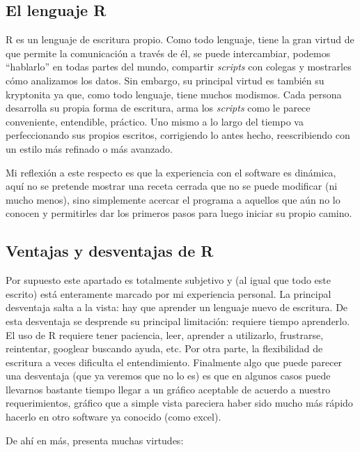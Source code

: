 \documentclass[
]{article}
\begin{document}
\subsection{El lenguaje R}\label{el-lenguaje-r}

R es un lenguaje de escritura propio. Como todo lenguaje, tiene la gran
virtud de que permite la comunicación a través de él, se puede
intercambiar, podemos ``hablarlo'' en todas partes del mundo, compartir
\emph{scripts} con colegas y mostrarles cómo analizamos los datos. Sin
embargo, su principal virtud es también su kryptonita ya que, como todo
lenguaje, tiene muchos modismos. Cada persona desarrolla su propia forma
de escritura, arma los \emph{scripts} como le parece conveniente,
entendible, práctico. Uno mismo a lo largo del tiempo va perfeccionando
sus propios escritos, corrigiendo lo antes hecho, reescribiendo con un
estilo más refinado o más avanzado.

Mi reflexión a este respecto es que la experiencia con el software es
dinámica, aquí no se pretende mostrar una receta cerrada que no se puede
modificar (ni mucho menos), sino simplemente acercar el programa a
aquellos que aún no lo conocen y permitirles dar los primeros pasos para
luego iniciar su propio camino.

\subsection{Ventajas y desventajas de
R}\label{ventajas-y-desventajas-de-r}

Por supuesto este apartado es totalmente subjetivo y (al igual que todo
este escrito) está enteramente marcado por mi experiencia personal. La
principal desventaja salta a la vista: hay que aprender un lenguaje
nuevo de escritura. De esta desventaja se desprende su principal
limitación: requiere tiempo aprenderlo. El uso de R requiere tener
paciencia, leer, aprender a utilizarlo, frustrarse, reintentar, googlear
buscando ayuda, etc. Por otra parte, la flexibilidad de escritura a
veces dificulta el entendimiento. Finalmente algo que puede parecer una
desventaja (que ya veremos que no lo es) es que en algunos casos puede
llevarnos bastante tiempo llegar a un gráfico aceptable de acuerdo a
nuestro requerimientos, gráfico que a simple vista pareciera haber sido
mucho más rápido hacerlo en otro software ya conocido (como excel).

De ahí en más, presenta muchas virtudes:
\end{document}
